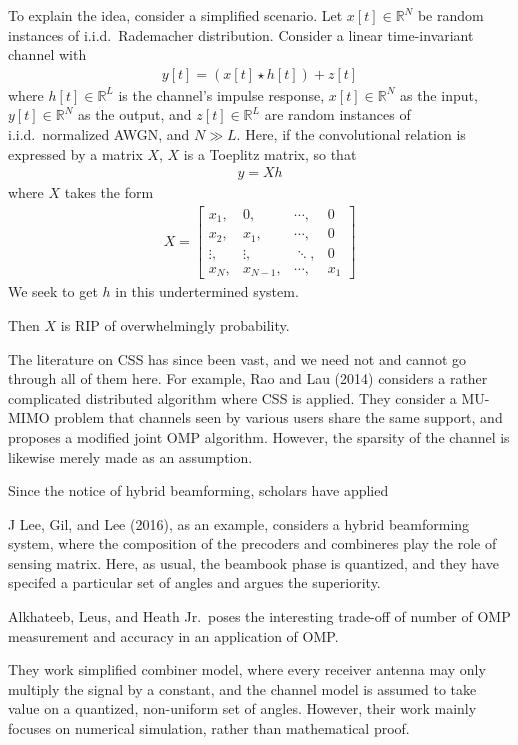 \documentclass[12pt]{article}
\begin{document}
To explain the idea, consider a simplified scenario.
Let \(x[t] \in \mathbb{R}^N\) be random instances of i.i.d.\ Rademacher distribution.
Consider a linear time-invariant channel with
\begin{gather}
y[t] =(x[t] \star h[t]) +z[t]
\end{gather}
where \(h[t] \in \mathbb{R}^L\) is the channel's impulse response, \(x[t] \in \mathbb{R}^N\) as the input, \(y[t] \in \mathbb{R}^N\) as the output, and \(z[t] \in \mathbb{R}^L\) are random instances of i.i.d.\ normalized AWGN, and \(N \gg L\).
Here, if the convolutional relation is expressed by a matrix \(X\), \(X\) is a Toeplitz matrix, so that
\begin{gather}
y =X h
\end{gather}
where \(X\) takes the form
\begin{align}
X
=\begin{bmatrix}
x_1, &0, &\cdots, &0 \\
x_2, &x_1, &\cdots, &0 \\
\vdots, &\vdots, &\ddots, &0 \\
x_N, &x_{N-1}, &\cdots, &x_1
\end{bmatrix}
\end{align}
We seek to get \(h\) in this undertermined system.

Then \(X\) is RIP of overwhelmingly probability.


The literature on CSS has since been vast, and we need not and cannot go through all of them here.
For example, Rao and Lau (2014) considers a rather complicated distributed algorithm where CSS is applied.
They consider a MU-MIMO problem that channels seen by various users share the same support, and proposes a modified joint OMP algorithm.
However, the sparsity of the channel is likewise merely made as an assumption.

Since the notice of hybrid beamforming, scholars have applied 

J Lee, Gil, and Lee (2016), as an example, considers a hybrid beamforming system, where the composition of the precoders and combineres play the role of sensing matrix.
Here, as usual, the beambook phase is quantized, and they have specifed a particular set of angles and argues the superiority.

Alkhateeb, Leus, and Heath Jr.\ poses the interesting trade-off of number of OMP measurement and accuracy in an application of OMP.

They work simplified combiner model, where every receiver antenna may only multiply the signal by a constant, and the channel model is assumed to take value on a quantized, non-uniform set of angles.
However, their work mainly focuses on numerical simulation, rather than mathematical proof.
\end{document}
